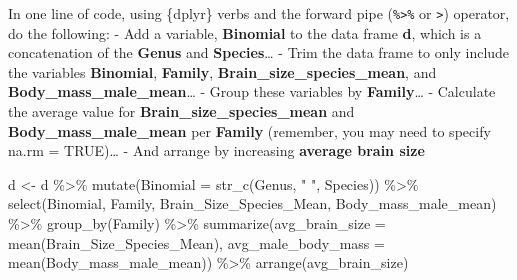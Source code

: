 \documentclass[
  letterpaper,
  DIV=11,
  numbers=noendperiod]{scrartcl}
\newenvironment{Shaded}{\begin{snugshade}}{\end{snugshade}}
\newcommand{\AttributeTok}[1]{\textcolor[rgb]{0.40,0.45,0.13}{#1}}
\newcommand{\FunctionTok}[1]{\textcolor[rgb]{0.28,0.35,0.67}{#1}}
\newcommand{\NormalTok}[1]{\textcolor[rgb]{0.00,0.23,0.31}{#1}}
\newcommand{\OtherTok}[1]{\textcolor[rgb]{0.00,0.23,0.31}{#1}}
\newcommand{\SpecialCharTok}[1]{\textcolor[rgb]{0.37,0.37,0.37}{#1}}
\newcommand{\StringTok}[1]{\textcolor[rgb]{0.13,0.47,0.30}{#1}}
\begin{document}
In one line of code, using \{dplyr\} verbs and the forward pipe
(\texttt{\%\textgreater{}\%} or \texttt{\textbar{}\textgreater{}})
operator, do the following: - Add a variable, \textbf{Binomial} to the
data frame \textbf{d}, which is a concatenation of the \textbf{Genus}
and \textbf{Species}\ldots{} - Trim the data frame to only include the
variables \textbf{Binomial}, \textbf{Family},
\textbf{Brain\_size\_species\_mean}, and
\textbf{Body\_mass\_male\_mean}\ldots{} - Group these variables by
\textbf{Family}\ldots{} - Calculate the average value for
\textbf{Brain\_size\_species\_mean} and \textbf{Body\_mass\_male\_mean}
per \textbf{Family} (remember, you may need to specify na.rm =
TRUE)\ldots{} - And arrange by increasing \textbf{average brain size}

\begin{Shaded}
\begin{Highlighting}[]
\NormalTok{d }\OtherTok{\textless{}{-}}\NormalTok{ d }\SpecialCharTok{\%\textgreater{}\%} 
  \FunctionTok{mutate}\NormalTok{(}\AttributeTok{Binomial =} \FunctionTok{str\_c}\NormalTok{(Genus, }\StringTok{" "}\NormalTok{, Species)) }\SpecialCharTok{\%\textgreater{}\%} 
  \FunctionTok{select}\NormalTok{(Binomial, Family, Brain\_Size\_Species\_Mean, Body\_mass\_male\_mean) }\SpecialCharTok{\%\textgreater{}\%} 
  \FunctionTok{group\_by}\NormalTok{(Family) }\SpecialCharTok{\%\textgreater{}\%} 
  \FunctionTok{summarize}\NormalTok{(}\AttributeTok{avg\_brain\_size =} \FunctionTok{mean}\NormalTok{(Brain\_Size\_Species\_Mean),}
            \AttributeTok{avg\_male\_body\_mass =} \FunctionTok{mean}\NormalTok{(Body\_mass\_male\_mean)) }\SpecialCharTok{\%\textgreater{}\%} 
  \FunctionTok{arrange}\NormalTok{(avg\_brain\_size)}
\end{Highlighting}
\end{Shaded}
\end{document}
